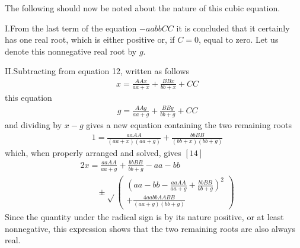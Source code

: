 \begingroup
\renewcommand{\arraystretch}{1.45}

The following should now be noted about the nature of this cubic equation.

I.\quad From the last term of the equation \(-aabbCC\) it is concluded that it certainly has one real root, which is either positive or, if \(C=0\), equal to zero. Let us denote this nonnegative real root by \(g\).

II.\quad Subtracting from equation 12, written as follows
\[
\begin{aligned}
&x=\frac{AAx}{aa+x}+\frac{BBx}{bb+x}+CC
\end{aligned}
\]
this equation\textperiodcentered
\[
\begin{aligned}
&g=\frac{AAg}{aa+g}+\frac{BBg}{bb+g}+CC
\end{aligned}
\]
and dividing by \(x-g\) gives a new equation containing the two remaining roots
\[
\begin{aligned}
&1=\frac{aaAA}{(aa+x)(aa+g)}+\frac{bbBB}{(bb+x)(bb+g)}
\end{aligned}
\]
which, when properly arranged and solved, gives \([14]\)
\[
\begin{aligned}
&2x=\frac{aaAA}{aa+g}+\frac{bbBB}{bb+g}-aa-bb\\[6pt]
&\qquad{}\pm\surd\!\left(\begin{gathered}\left(aa-bb-\frac{aaAA}{aa+g}+\frac{bbBB}{bb+g}\right)^2
\\[6pt]+\frac{4aabbAABB}{(aa+g)(bb+g)}\end{gathered}\right)
\end{aligned}
\]
Since the quantity under the radical sign is by its nature positive, or at least nonnegative, this expression shows that the two remaining roots are also always real.

